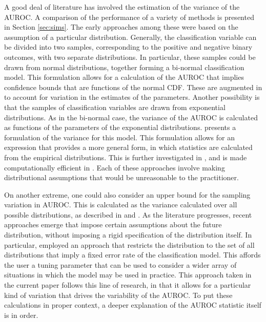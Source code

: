 A good deal of literature has involved the estimation of the variance of the AUROC.
%
A comparison of the performance of a variety of methods is presented in Section \ref{sec:sims}.
%
The early approaches among these were based on the assumption of a particular distribution.
Generally, the classification variable can be divided into two samples, corresponding to the positive and negative binary outcomes, with two separate distributions.
In particular, these samples could be drawn from normal distributions, together forming a bi-normal classification model.
This formulation allows for a calculation of the AUROC that implies confidence bounds that are functions of the normal CDF.
These are augmented in \citet{demidenko2012} to account for variation in the estimates of the parameters.
Another possibility is that the samples of classification variables are drawn from exponential distributions.
As in the bi-normal case, the variance of the AUROC is calculated as functions of the parameters of the exponential distributions.
\citet{hanleymcneil1982} presents a formulation of the variance for this model.
This formulation allows for an expression that provides a more general form, in which statistics are calculated from the empirical distributions.
This is further investigated in \citet{delong1988}, and is made computationally efficient in \citet{sunxu2014}.
Each of these approaches involve making distributional assumptions that would be unreasonable to the practitioner.

On another extreme, one could also consider an upper bound for the sampling variation in AUROC.
This is calculated as the variance calculated over all possible distributions, as described in \citet{birn1957} and \citet{vandan1915}.
As the literature progresses, recent approaches emerge that impose certain assumptions about the future distribution,
without imposing a rigid specification of the distribution itself.
%
In particular, \citet{cortezMohri2004} employed an approach that restricts the distribution to the set of all distributions
that imply a fixed error rate of the classification model.
This affords the user a tuning parameter that can be used to consider a wider array of situations in which the model may be used in practice.
%
This approach taken in the current paper follows this line of research, in that it allows for a particular kind of variation that drives the variability of the AUROC.
%
To put these calculations in proper context, a deeper explanation of the AUROC statistic itself is in order.

